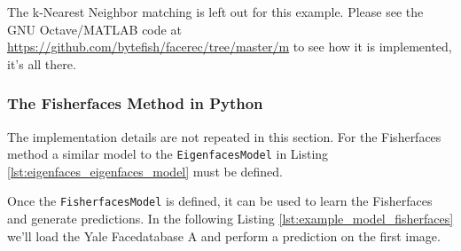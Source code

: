 \ifx\python\undefined
	The k-Nearest Neighbor matching is left out for this example. Please see the GNU Octave/MATLAB code at \url{https://github.com/bytefish/facerec/tree/master/m} to see how it is implemented, it's all there.
\else
	\subsubsection{The Fisherfaces Method in Python}
	The implementation details are not repeated in this section. For the Fisherfaces method a similar model to the \lstinline|EigenfacesModel| in Listing \ref{lst:eigenfaces_eigenfaces_model} must be defined.
		
	
	
		Once the \lstinline|FisherfacesModel| is defined, it can be used to learn the Fisherfaces and generate predictions. In the following Listing \ref{lst:example_model_fisherfaces} we'll load the Yale Facedatabase A and perform a prediction on the first image.
		
	

\fi


